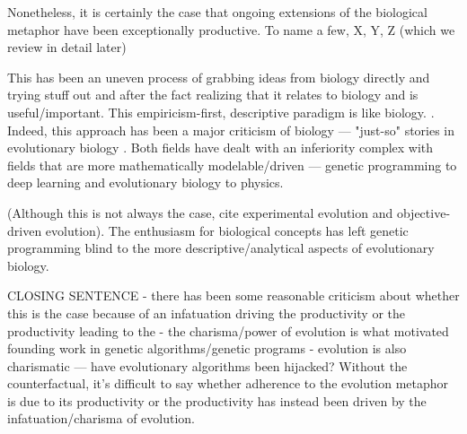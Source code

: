 Nonetheless, it is certainly the case that ongoing extensions of the biological metaphor have been exceptionally productive.
To name a few, X, Y, Z (which we review in detail later)

This has been an uneven process of grabbing ideas from biology directly and trying stuff out and after the fact realizing that it relates to biology and is useful/important.
This empiricism-first, descriptive paradigm is like biology. \citep{welch2017wrong}.
Indeed, this approach has been a major criticism of biology --- "just-so" stories in evolutionary biology \citep{smith2016explanations}.
Both fields have dealt with an inferiority complex with fields that are more mathematically modelable/driven --- genetic programming to deep learning and evolutionary biology to physics.

(Although this is not always the case, cite experimental evolution and objective-driven evolution).
The enthusiasm for biological concepts has left genetic programming blind to the more descriptive/analytical aspects of evolutionary biology.

CLOSING SENTENCE
- there has been some reasonable criticism about whether this is the case because of an infatuation driving the productivity or the productivity leading to the
- the charisma/power of evolution is what motivated founding work in genetic algorithms/genetic programs
- evolution is also charismatic --- have evolutionary algorithms been hijacked?
Without the counterfactual, it's difficult to say whether adherence to the evolution metaphor is due to its productivity or the productivity has instead been driven by the infatuation/charisma of evolution.
